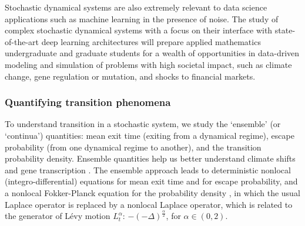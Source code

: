 \documentclass[11pt]{NSFamsart}
\begin{document}
 
Stochastic dynamical systems are also extremely relevant to data science applications such as machine learning in the presence of  noise. 
The study of complex stochastic dynamical systems with a focus on their interface with state-of-the-art deep learning architectures will prepare applied mathematics undergraduate and graduate students for a wealth of opportunities in data-driven modeling and simulation of problems with high societal impact, such as climate change, gene regulation or mutation, and shocks to financial markets.


\subsubsection*{Quantifying transition phenomena}
To understand transition in a stochastic system, we study the `ensemble' (or `continua') quantities: mean exit time (exiting from a dynamical regime), escape probability (from one dynamical regime to another), and  the transition  probability density. Ensemble quantities help us better understand  climate shifts \cite{ZhengYY2020} and  gene transcription \cite{ChenWuDuan}. 
The ensemble approach leads to deterministic  nonlocal (integro-differential) equations for mean exit time and for escape probability, and a nonlocal Fokker-Planck equation for the probability density \cite{DuanBook2015},
in which the usual Laplace operator is replaced
by a nonlocal Laplace operator, which is related to the generator of L\'evy motion $L_t^\alpha$:  $-(-\Delta)^{\frac{\alpha}2  }$, for $\alpha \in (0, 2)$.
 
 
\end{document}
